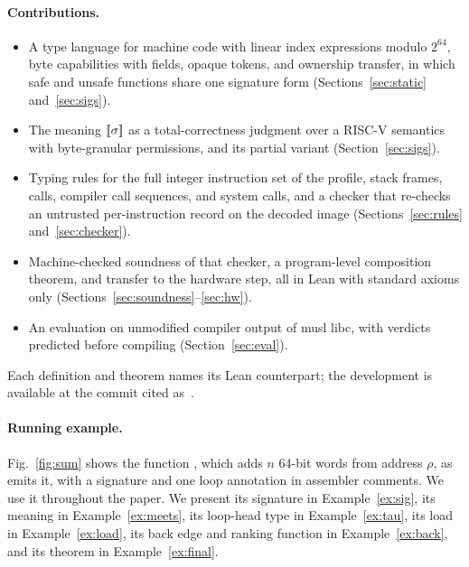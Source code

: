 \paragraph{Contributions.}
\begin{itemize}
\item A type language for machine code with linear index expressions modulo $2^{64}$, byte capabilities with fields, opaque tokens, and ownership transfer, in which safe and unsafe functions share one signature form (Sections~\ref{sec:static} and~\ref{sec:sigs}).
\item The meaning $[\![\sigma]\!]$ as a total-correctness judgment over a RISC-V semantics with byte-granular permissions, and its partial variant (Section~\ref{sec:sigs}).
\item Typing rules for the full integer instruction set of the profile, stack frames, calls, compiler call sequences, and system calls, and a checker that re-checks an untrusted per-instruction record on the decoded image (Sections~\ref{sec:rules} and~\ref{sec:checker}).
\item Machine-checked soundness of that checker, a program-level composition theorem, and transfer to the hardware step, all in Lean with standard axioms only (Sections~\ref{sec:soundness}--\ref{sec:hw}).
\item An evaluation on unmodified compiler output of musl libc, with verdicts predicted before compiling (Section~\ref{sec:eval}).
\end{itemize}
Each definition and theorem names its Lean counterpart; the development is available at the commit cited as~\cite{nocompiler}.

\paragraph{Running example.} Fig.~\ref{fig:sum} shows the function , which adds $n$ 64-bit words from address $\rho$, as  emits it, with a signature and one loop annotation in assembler comments. We use it throughout the paper. We present its signature in Example~\ref{ex:sig}, its meaning in Example~\ref{ex:meets}, its loop-head type in Example~\ref{ex:tau}, its load in Example~\ref{ex:load}, its back edge and ranking function in Example~\ref{ex:back}, and its theorem in Example~\ref{ex:final}.

